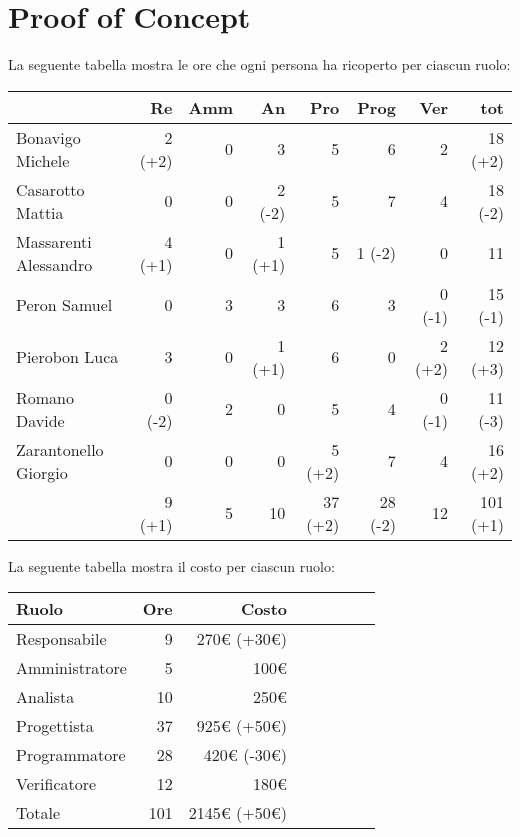 \section{Proof of Concept}



La seguente tabella mostra le ore che ogni persona ha ricoperto per ciascun ruolo:

\begin{table}[ht]
    \begin{tabularx}{\linewidth}{X|rrrrrrr}
    \rowcolor{gray!30}& Re & Amm & An & Pro & Prog & Ver & tot \\
    \hline
    Bonavigo Michele                        & 2 (+2)    & 0     & 3      & 5      & 6         & 2      & 18 (+2) \\
    \rowcolor{gray!10}Casarotto Mattia      & 0         & 0     & 2 (-2) & 5      & 7         & 4      & 18 (-2)\\
    Massarenti Alessandro                   & 4 (+1)    & 0     & 1 (+1) & 5      & 1 (-2)    & 0      & 11 \\
    \rowcolor{gray!10}Peron Samuel          & 0         & 3     & 3      & 6      & 3         & 0 (-1) & 15 (-1) \\
    Pierobon Luca                           & 3         & 0     & 1 (+1) & 6      & 0         & 2 (+2) & 12 (+3)  \\
    \rowcolor{gray!10}Romano Davide         & 0 (-2)    & 2     & 0      & 5      & 4         & 0 (-1) & 11 (-3) \\
    Zarantonello Giorgio                    & 0         & 0     & 0      & 5 (+2) & 7         & 4      & 16 (+2) \\
    \hline                                  & 9 (+1)    & 5     & 10     & 37 (+2)& 28 (-2)   & 12     & 101 (+1) \\ 
    \end{tabularx}
\end{table}


La seguente tabella mostra il costo per ciascun ruolo:
\begin{table}[ht]
    \begin{tabularx}{\linewidth}{X|rrrrrrr}
    \rowcolor{gray!30}Ruolo & Ore & Costo \\
    \hline
    Responsabile                            & 9     & 270€ (+30€)\\
    \rowcolor{gray!10}Amministratore        & 5     & 100€ \\
    Analista                                & 10    & 250€ \\
    \rowcolor{gray!10}Progettista           & 37    & 925€ (+50€) \\
    Programmatore                           & 28    & 420€ (-30€) \\
    \rowcolor{gray!10}Verificatore          & 12    & 180€ \\
    \hline Totale                           & 101   & 2145€ (+50€) \\ 
    \end{tabularx}
\end{table}

